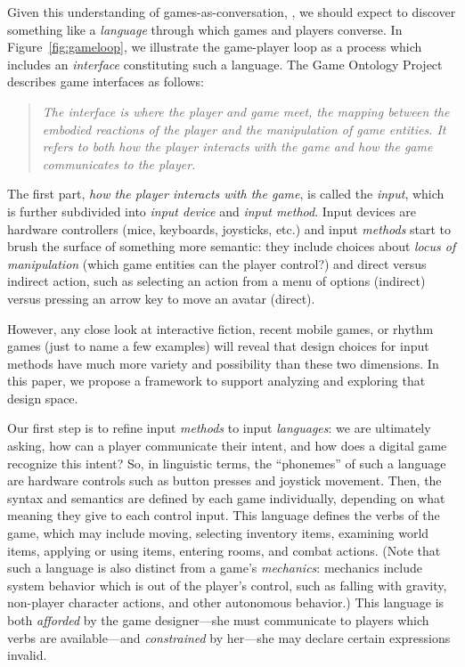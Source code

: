 \documentclass[sigconf]{acmart}
\begin{document}
Given this understanding of games-as-conversation, , we should expect to
discover something like a {\em language} through which games and players converse. 
In Figure~\ref{fig:gameloop}, we illustrate the game-player loop as a
process which includes an {\em interface} constituting such a language.
The Game Ontology Project~\cite{zagal2007towards} describes game interfaces
as follows:
\begin{quote} \em
The interface is where the player and game meet, the mapping
between the embodied reactions of the player and the manipulation of game
entities. It refers to both how the player interacts with the game and how
the game communicates to the player.
\end{quote}
The first part, {\em how the player interacts with the game}, is
called the {\em input}, which is further subdivided into {\em input device}
and {\em input method}. Input devices are hardware controllers (mice,
keyboards, joysticks, etc.) and input {\em methods} start to brush the
surface of something more semantic: they include choices about {\em locus of
manipulation} (which game entities can the player control?) and direct
versus indirect action, such as selecting an action from a menu of options
(indirect) versus pressing an arrow key to move an avatar (direct).

However, any close look at interactive fiction, recent mobile games, or
rhythm games (just to name a few examples) will reveal that design choices
for input methods have much more variety and possibility than these two
dimensions. In this paper, we propose a framework to support analyzing and exploring
that design space. 

Our first step is to refine input {\em methods} to input {\em languages}:
we are ultimately asking, how can a player communicate their intent, and
how does a digital game recognize this intent?  So, in linguistic terms,
the ``phonemes'' of such a language are hardware controls such as button
presses and joystick movement. Then, the syntax and semantics are defined
by each game individually, depending on what meaning they give to each
control input. This language defines the verbs of the game, which may
include moving, selecting inventory items, examining world items, applying
or using items, entering rooms, and combat actions.  (Note that such a
language is also distinct from a game's {\em mechanics}: mechanics include
system behavior which is out of the player's control, such as falling with
gravity, non-player character actions, and other autonomous behavior.) This
language is both {\em afforded} by the game designer---she must communicate
to players which verbs are available---and {\em constrained} by her---she
may declare certain expressions invalid.
\end{document}
